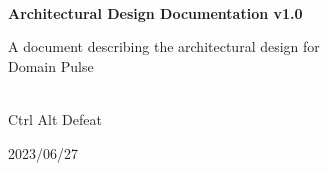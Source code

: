 \begin{titlepage}
    \centering


    
    \vspace{2cm}
    \hrulefill\\
    \vspace{1cm}
    {\Huge\bfseries Architectural Design Documentation v1.0}
    
    \vspace{1cm}
    
    {\Large A document describing the architectural design for\\Domain Pulse}\\
    \vspace{1cm}
    \hrulefill\\
    
    \vfill
    
    {\large Ctrl Alt Defeat}
    
    \vspace{1cm}
    
    {\large 2023/06/27}\\
    
\end{titlepage}
  
